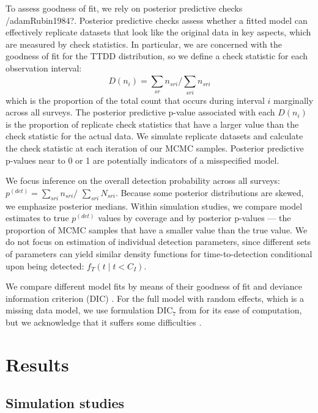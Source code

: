 \documentclass[useAMS,usenatbib,referee,12pt]{article}
\begin{document}
To assess goodness of fit, we rely on posterior predictive checks \citep{Gelman1996}/adam{Rubin1984?}.  Posterior predictive checks assess whether a fitted model can effectively replicate datasets that look like the original data in key aspects, which are measured by check statistics.  In particular, we are concerned with the goodness of fit for the TTDD distribution, so we define a check statistic for each observation interval:
\[D(n_i) = \sum\limits_{sr} n_{sri} \big/ \sum\limits_{sri}^{} n_{sri}\]
which is the proportion of the total count that occurs during interval $i$ marginally across all surveys.  The posterior predictive p-value associated with each $D(n_i)$ is the proportion of replicate check statistics that have a larger value than the check statistic for the actual data.  We simulate replicate datasets and calculate the check statistic at each iteration of our MCMC samples.  Posterior predictive p-values near to 0 or 1 are potentially indicators of a misspecified model.

We focus inference on the overall detection probability across all surveys: $p^{(det)} = \sum\limits_{sri}n_{sri}\big/$ $\sum\limits_{sri}N_{sri}$.  Because some posterior distributions are skewed, we emphasize posterior medians.  Within simulation studies, we compare model estimates to true $p^{(det)}$ values by coverage and by posterior p-values --- the proportion of MCMC samples that have a smaller value than the true value.  We do not focus on estimation of individual detection parameters, since different sets of parameters can yield similar density functions for time-to-detection conditional upon being detected: $f_T(t\;|\;t<C_I)$.

We compare different model fits by means of their goodness of fit and deviance information criterion (DIC) \citep{Spiegelhalter2002}.  For the full model with random effects, which is a missing data model, we use formulation DIC$_7$ from \citet{Celeux2006} for its ease of computation, but we acknowledge that it suffers some difficulties \citep{Celeux2006, Li2014}.




\section{Results}\label{sec:results}

\subsection{Simulation studies}
\end{document}
